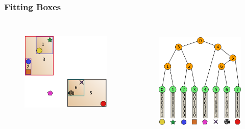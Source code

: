 \documentclass{beamer}
\begin{document}
\begin{frame}
  \frametitle{Fitting Boxes}
  
\begin{columns}[t]

\begin{figure}
\includegraphics[height=45mm]{fit_2.png}
\end{figure}

\begin{figure}
\includegraphics[height=55mm]{radix_tree_bare.png}
\end{figure}
\end{columns}
\end{frame}
\end{document}
